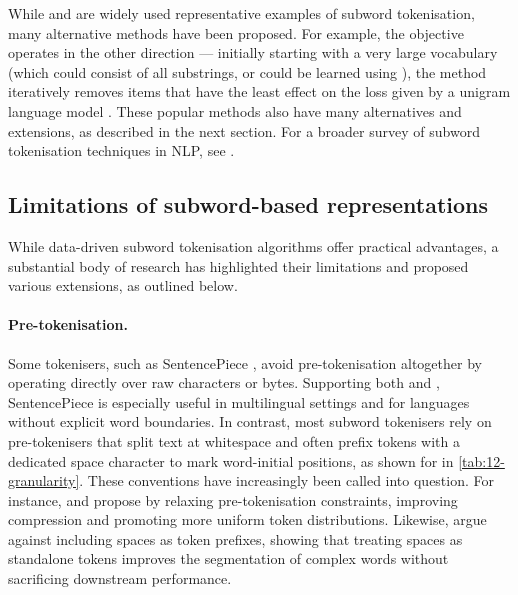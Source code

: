 While \bpe and \wordpiecefull are widely used representative examples of subword tokenisation, many alternative methods have been proposed. For example, the \unigram objective operates in the other direction --- initially starting with a very large vocabulary (which could consist of all substrings, or could be learned using \bpe), the method iteratively removes items that have the least effect on the loss given by a unigram language model \citep{kudo-2018-unigram}. These popular methods also have many alternatives and extensions, as described in the next section.
For a broader survey of subword tokenisation techniques in NLP, see \citet{mielke2021between}.

\subsection{Limitations of subword-based representations}\label{sec:12-subwordlimitations}

While data-driven subword tokenisation algorithms offer practical advantages, a substantial body of research has highlighted their limitations and proposed various extensions, as outlined below.

\paragraph{Pre-tokenisation.} Some tokenisers, such as SentencePiece \citep{kudo-richardson-2018-sentencepiece}, avoid pre-tokenisation altogether by operating directly over raw characters or bytes. Supporting both \bpe and \unigram, SentencePiece is especially useful in multilingual settings and for languages without explicit word boundaries. In contrast, most subword tokenisers rely on pre-tokenisers that split text at whitespace and often prefix tokens with a dedicated space character to mark word-initial positions, as shown for \bpe in \cref{tab:12-granularity}. These conventions have increasingly been called into question. For instance, \citet{schmidt2025boundless} and \citet{liu2025superbpespacetravellanguage} propose  by relaxing pre-tokenisation constraints, improving compression and promoting more uniform token distributions. Likewise, \citet{gow-smith-etal-2022-improving} argue against including spaces as token prefixes, showing that treating spaces as standalone tokens improves the segmentation of complex words without sacrificing downstream performance.

